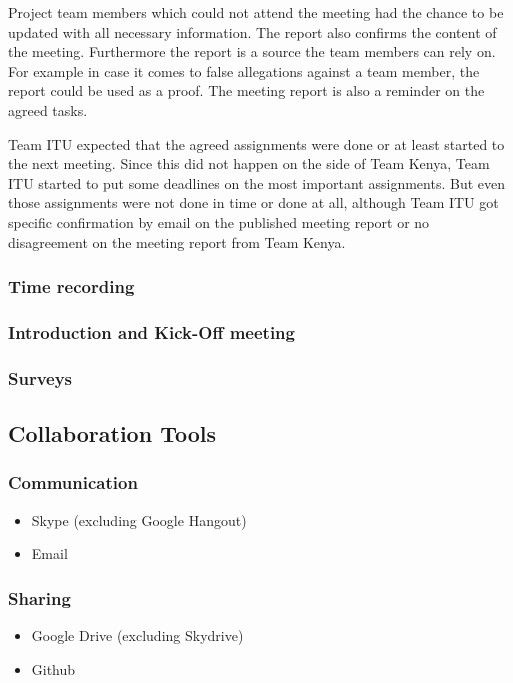 Project team members which could not attend the meeting had the chance to be updated with all necessary information. The report also confirms the content of the meeting. Furthermore the report is a source the team members can rely on. For example in case it comes to false allegations against a team member, the report could be used as a proof. The meeting report is also a reminder on the agreed tasks.

Team ITU expected that the agreed assignments were done or at least started to the next meeting. Since this did not happen on the side of Team Kenya, Team ITU started to put some deadlines on the most important assignments. But even those assignments were not done in time or done at all, although Team ITU got specific confirmation by email on the published meeting report or no disagreement on the meeting report from Team Kenya.

\subsubsection {Time recording}
\subsubsection {Introduction and Kick-Off meeting}
\subsubsection {Surveys}


\subsection{Collaboration Tools}

\subsubsection {Communication}
	\begin{itemize}
		\item Skype (excluding Google Hangout)
		\item Email
	\end{itemize}
\subsubsection {Sharing}
	\begin{itemize}
		\item Google Drive (excluding Skydrive)
		\item Github
	\end{itemize}
